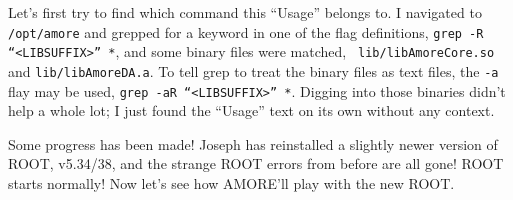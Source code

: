 \documentclass[12pt]{article}
\begin{document}
\qq Let's first try to find which command this ``Usage'' belongs to. I navigated
to {\tt /opt/amore} and grepped for a keyword in one of the flag definitions,
{\tt grep -R ``<LIBSUFFIX>'' *}, and some binary files were matched, {\tt
  lib/libAmoreCore.so} and {\tt lib/libAmoreDA.a}. To tell grep to treat the
binary files as text files, the {\tt -a} flay may be used, {\tt grep -aR
  ``<LIBSUFFIX>'' *}. Digging into those binaries didn't help a whole lot; I
just found the ``Usage'' text on its own without any context.

\qq Some progress has been made! Joseph has reinstalled a slightly newer version
of ROOT, v5.34/38, and the strange ROOT errors from before are all gone! ROOT
starts normally! Now let's see how AMORE'll play with the new ROOT.

\qq 

\end{document}
